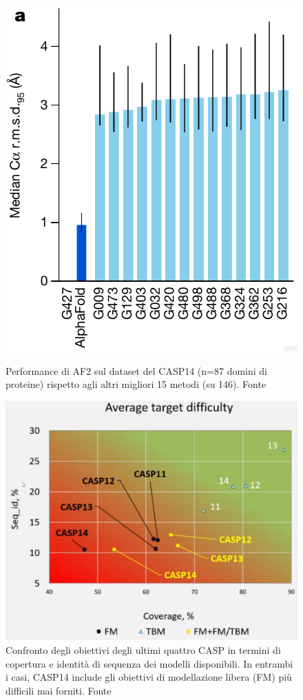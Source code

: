 \begin{figure}[!htb]
	\centering
	\includegraphics[scale=0.3]{images/af-res.png}
	\caption{Performance di AF2 sul dataset del CASP14 (n=87 domini di proteine) rispetto agli altri migliori 15 metodi (su 146). Fonte\cite{jumper2021highly}}
	\label{fig:performanceAF2}
	\endminipage\hfill
	\centering
	\includegraphics[scale=0.3]{images/casp-difficuty.png}
	\caption{Confronto degli obiettivi degli ultimi quattro CASP in termini di copertura e identità di sequenza dei modelli disponibili. In entrambi i casi, CASP14 include gli obiettivi di modellazione libera (FM) più difficili mai forniti. Fonte\cite{blopigAF}}
	\label{fig:casp-difficulty}
	\endminipage\hfill
\end{figure}

